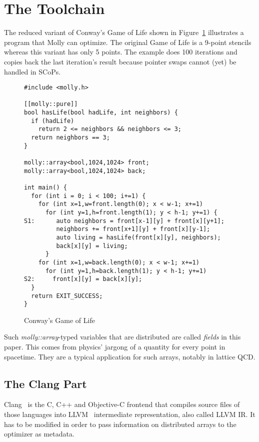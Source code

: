 \documentclass{sigplanconf}
\begin{document}
\section{The Toolchain}\label{sct:toolchain}

The reduced variant of Conway's Game of Life shown in Figure~\ref{fig:conway} illustrates a program that Molly can optimize. The original Game of Life is a 9-point stencils whereas this variant has only 5 points. The example does 100 iterations and copies back the last iteration's result because pointer swaps cannot (yet) be handled in SCoPs.

\begin{figure}[htb]
{\small\begin{verbatim}
#include <molly.h>

[[molly::pure]] 
bool hasLife(bool hadLife, int neighbors) {
  if (hadLife)
    return 2 <= neighbors && neighbors <= 3;
  return neighbors == 3;
}

molly::array<bool,1024,1024> front;
molly::array<bool,1024,1024> back;

int main() {
  for (int i = 0; i < 100; i+=1) {
    for (int x=1,w=front.length(0); x < w-1; x+=1)
      for (int y=1,h=front.length(1); y < h-1; y+=1) {
S1:      auto neighbors = front[x-1][y] + front[x][y+1];
         neighbors += front[x+1][y] + front[x][y-1];  
         auto living = hasLife(front[x][y], neighbors);     
         back[x][y] = living;
      }
    for (int x=1,w=back.length(0); x < w-1; x+=1)
      for (int y=1,h=back.length(1); y < h-1; y+=1)
S2:     front[x][y] = back[x][y];
  }
  return EXIT_SUCCESS;
}
\end{verbatim}}
\caption{Conway's Game of Life}\label{fig:conway}
\end{figure}

Such \emph{molly::array}-typed variables that are distributed are called \emph{fields} in this paper. This comes from physics' jargong of a quantity for every point in spacetime. They are a typical application for such arrays, notably in lattice QCD.


\subsection{The Clang Part}

Clang~\cite{clang} is the C, C++ and Objective-C frontend that compiles source files of those languages into LLVM~\cite{llvm} intermediate representation, also called LLVM IR. It has to be modified in order to pass information on distributed arrays to the optimizer as metadata.
\end{document}
